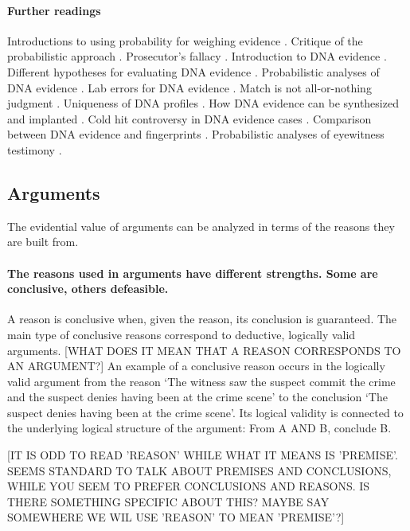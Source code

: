 \documentclass[10pt]{article}
\begin{document}
\paragraph{Further readings} Introductions to using probability for weighing evidence 
 \citep{finkelsteinFairley1970, dawid2002, mortera2007}. Critique 
of the probabilistic approach \citep{tribe1971, cohen1977, allenPardo2007}.
Prosecutor's fallacy \citep{thompsonSchuman1987}.
Introduction to DNA evidence \citep{wasserman2008, kayeSensabaugh2000}.
Different hypotheses for evaluating DNA evidence \citep{koehler1993, cookEtAl1998, evettEtal2000}. 
Probabilistic analyses of DNA evidence  \citep{robertsonVignaux1995, buckleton2005, balding2005}. 
 Lab errors for DNA evidence \citep{thompsonEtAl2003}. 
 Match is not all-or-nothing judgment \citep{kaye1993}. 
Uniqueness of DNA profiles  \citep{kaye2013, weir2007}.
How DNA evidence can be synthesized and implanted \citep{frumkinEtAl2009}. 
Cold hit controversy in DNA evidence cases \citep{NRC1996, baldingDonnely1996}. 
Comparison between DNA evidence and fingerprints  \citep{zabell2005}. 
Probabilistic analyses of eyewitness testimony \citep{friedman1987, schumStarace2001}. 

\subsection{Arguments}
\label{sec:valueArgs}

The evidential value of arguments can be analyzed in terms of the reasons they are built from.

\paragraph{The reasons used in arguments have different strengths. Some are conclusive, others defeasible.} A reason is conclusive when, given  the reason, its conclusion is guaranteed. The main type of conclusive reasons correspond to deductive, logically valid arguments. [WHAT DOES IT MEAN THAT A REASON CORRESPONDS TO AN ARGUMENT?] An example of a conclusive reason occurs in the logically valid argument from the reason `The witness saw the suspect commit the crime and the suspect denies having been at the crime scene' to the conclusion `The suspect denies having been at the crime scene'. Its logical validity is connected to the underlying logical structure of the argument: From A AND B, conclude B. 

[IT IS ODD TO READ 'REASON' WHILE WHAT IT MEANS IS 'PREMISE'. SEEMS STANDARD TO TALK ABOUT PREMISES AND CONCLUSIONS, WHILE YOU SEEM TO PREFER CONCLUSIONS 
AND REASONS. IS THERE SOMETHING SPECIFIC ABOUT THIS? MAYBE SAY SOMEWHERE WE WIL USE 'REASON' TO MEAN 'PREMISE'?]
\end{document}
